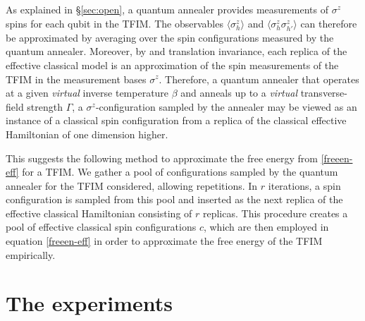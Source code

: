 \documentclass[pra,twocolumn,floatfix,superscriptaddress]{revtex4}
\begin{document}
As explained in \S\ref{sec:open}, a quantum annealer provides measurements of $\sigma^z$ spins for each qubit in the TFIM. The observables $\langle\sigma_h^z\rangle$ and $\langle \sigma_h^z \sigma_{h'}^z \rangle$ can therefore be approximated by averaging over the spin configurations measured by the quantum annealer. Moreover, by \cite[Theorem 6]{suzuki1976relationship} and translation invariance, each replica of the effective classical model is an approximation of the spin measurements of the TFIM in the measurement bases $\sigma^z$. 
Therefore,  a quantum annealer that operates at a given \emph{virtual} inverse temperature $\beta$ and anneals up to a \emph{virtual} transverse-field strength $\Gamma$, a $\sigma^z$-configuration sampled by the annealer may be viewed as an instance of a classical spin configuration from a replica of the classical effective Hamiltonian of one dimension higher. 

This suggests the following method to approximate the free energy from \eqref{freeen-eff} for a TFIM. We gather a pool of configurations sampled by the quantum annealer for the TFIM considered, allowing repetitions. In $r$ iterations, a spin configuration is sampled from this pool and inserted as the next replica of the effective classical Hamiltonian consisting of $r$ replicas. 
This procedure creates a pool of effective classical spin configurations $c$, which are then employed in equation \eqref{freeen-eff} in order to approximate the free energy of the TFIM empirically. 


\section{The experiments}  \label{sec:exp}
\end{document}

